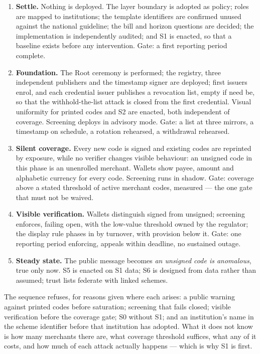 \documentclass[10pt,a4paper,twocolumn]{article}
\begin{document}
\begin{enumerate}[leftmargin=1.6em]
  \item \textbf{Settle.} Nothing is deployed. The layer boundary is adopted as
    policy; roles are mapped to institutions; the template identifiers are
    confirmed unused against the national guideline; the bill and horizon
    questions are decided; the implementation is independently audited; and S1
    is enacted, so that a baseline exists before any intervention. Gate: a
    first reporting period complete.
  \item \textbf{Foundation.} The Root ceremony is performed; the registry,
    three independent publishers and the timestamp signer are deployed; first
    issuers enrol, and each credential issuer publishes a revocation list,
    empty if need be, so that the withhold-the-list attack is closed from the
    first credential. Visual uniformity for printed codes and S2 are enacted,
    both independent of coverage. Screening deploys in advisory mode. Gate: a
    list at three mirrors, a timestamp on schedule, a rotation rehearsed, a
    withdrawal rehearsed.
  \item \textbf{Silent coverage.} Every new code is signed and existing codes
    are reprinted by exposure, while no verifier changes visible behaviour: an
    unsigned code in this phase is an unenrolled merchant. Wallets show payee,
    amount and alphabetic currency for every code. Screening runs in shadow.
    Gate: coverage above a stated threshold of active merchant codes, measured
    --- the one gate that must not be waived.
  \item \textbf{Visible verification.} Wallets distinguish signed from
    unsigned; screening enforces, failing open, with the low-value threshold
    owned by the regulator; the display rule phases in by turnover, with
    provision below it. Gate: one reporting period enforcing, appeals within
    deadline, no sustained outage.
  \item \textbf{Steady state.} The public message becomes \emph{an unsigned
    code is anomalous}, true only now. S5 is enacted on S1 data; S6 is designed
    from data rather than assumed; trust lists federate with linked schemes.
\end{enumerate}

\noindent The sequence refuses, for reasons given where each arises: a public
warning against printed codes before saturation; screening that fails closed;
visible verification before the coverage gate; S0 without S1; and an
institution's name in the scheme identifier before that institution has
adopted. What it does not know is how many merchants there are, what coverage
threshold suffices, what any of it costs, and how much of each attack actually
happens --- which is why S1 is first.
\end{document}
